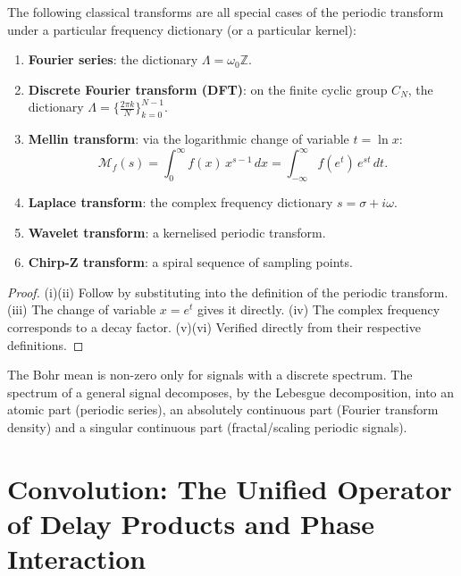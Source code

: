 \begin{theorem}\label{thm:classical_transforms_periodic}
The following classical transforms are all special cases of the periodic transform under a particular frequency dictionary (or a particular kernel):
\begin{enumerate}[label=(\roman*)]
    \item \textbf{Fourier series}: the dictionary $\Lambda = \omega_0\mathbb{Z}$.
    \item \textbf{Discrete Fourier transform (DFT)}: on the finite cyclic group $C_N$, the dictionary $\Lambda = \{\frac{2\pi k}{N}\}_{k=0}^{N-1}$.
    \item \textbf{Mellin transform}: via the logarithmic change of variable $t = \ln x$:
    \[
    \mathcal{M}_f(s) = \int_0^\infty f(x)\, x^{s-1}\,dx = \int_{-\infty}^{\infty} f(e^t)\, e^{st}\,dt.
    \]
    \item \textbf{Laplace transform}: the complex frequency dictionary $s = \sigma + i\omega$.
    \item \textbf{Wavelet transform}: a kernelised periodic transform.
    \item \textbf{Chirp-Z transform}: a spiral sequence of sampling points.
\end{enumerate}
\end{theorem}

\begin{proof}
(i)(ii) Follow by substituting into the definition of the periodic transform. (iii) The change of variable $x = e^t$ gives it directly. (iv) The complex frequency corresponds to a decay factor. (v)(vi) Verified directly from their respective definitions.
\end{proof}

\begin{remark}\label{rem:spectrum_decomposition}
The Bohr mean is non-zero only for signals with a discrete spectrum. The spectrum of a general signal decomposes, by the Lebesgue decomposition, into an atomic part (periodic series), an absolutely continuous part (Fourier transform density) and a singular continuous part (fractal/scaling periodic signals).
\end{remark}

\section{\texorpdfstring{Convolution: The Unified Operator of Delay Products and Phase Interaction}{Convolution}}

